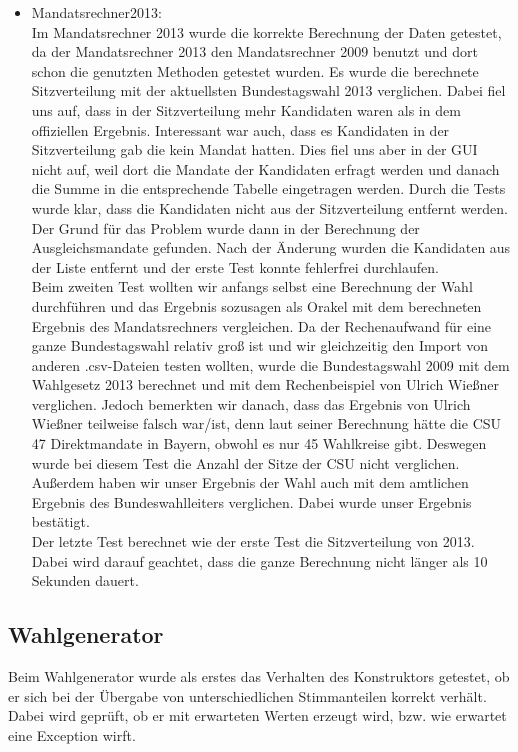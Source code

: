 \documentclass[12pt,a4paper,titlepage]{article}
\begin{document}
\begin{itemize}
\item Mandatsrechner2013:\\
Im Mandatsrechner 2013 wurde die korrekte Berechnung der Daten getestet, da der Mandatsrechner 2013 den Mandatsrechner 2009 benutzt und dort schon die genutzten Methoden getestet wurden. Es wurde die berechnete Sitzverteilung mit der aktuellsten Bundestagswahl 2013 verglichen. Dabei fiel uns auf, dass in der Sitzverteilung mehr Kandidaten waren als in dem offiziellen Ergebnis. Interessant war auch, dass es Kandidaten in der Sitzverteilung gab die kein Mandat hatten. Dies fiel uns aber in der GUI nicht auf, weil dort die Mandate der Kandidaten erfragt werden und danach die Summe in die entsprechende Tabelle eingetragen werden. Durch die Tests wurde klar, dass die Kandidaten nicht aus der Sitzverteilung entfernt werden. Der Grund für das Problem wurde dann in der Berechnung der Ausgleichsmandate gefunden. Nach der Änderung wurden die Kandidaten aus der Liste entfernt und der erste Test konnte fehlerfrei durchlaufen. \\
Beim zweiten Test wollten wir anfangs selbst eine Berechnung der Wahl durchführen und das Ergebnis sozusagen als Orakel mit dem berechneten Ergebnis des Mandatsrechners vergleichen. Da der Rechenaufwand für eine ganze Bundestagswahl relativ groß ist und wir gleichzeitig den Import von anderen .csv-Dateien testen wollten, wurde die Bundestagswahl 2009 mit dem Wahlgesetz 2013 berechnet und mit dem Rechenbeispiel von Ulrich Wießner verglichen. Jedoch bemerkten wir danach, dass das Ergebnis von Ulrich Wießner teilweise falsch war/ist, denn laut seiner Berechnung hätte die CSU 47 Direktmandate in Bayern, obwohl es nur 45 Wahlkreise gibt. Deswegen wurde bei diesem Test die Anzahl der Sitze der CSU nicht verglichen. Außerdem haben wir unser Ergebnis der Wahl auch mit dem amtlichen Ergebnis des Bundeswahlleiters verglichen. Dabei wurde unser Ergebnis bestätigt. \\
Der letzte Test berechnet wie der erste Test die Sitzverteilung von 2013. Dabei wird darauf geachtet, dass die ganze Berechnung nicht länger als 10 Sekunden dauert. 

\end{itemize}

\subsection{Wahlgenerator}
Beim Wahlgenerator wurde als erstes das Verhalten des Konstruktors getestet, ob er sich bei der Übergabe von unterschiedlichen Stimmanteilen korrekt verhält. Dabei wird geprüft, ob er mit erwarteten Werten erzeugt wird, bzw. wie erwartet eine Exception wirft.\\
\end{document}
